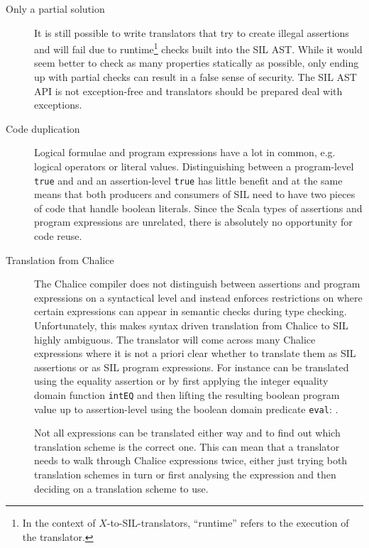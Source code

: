\begin{description}
\item[Only a partial solution] It is still possible to write translators that try to create illegal assertions and will fail due to runtime\footnote{In the context of $X$-to-SIL-translators, ``runtime'' refers to the execution of the translator.} checks built into the SIL AST.
While it would seem better to check as many properties statically as possible, only ending up with partial checks can result in a false sense of security. The SIL AST API is not exception-free and translators should be prepared deal with exceptions.
\item[Code duplication] Logical formulae and program expressions have a lot in common, e.g. logical operators or literal values. 
Distinguishing between a program-level \lstinline[language=Chalice]!true! and and an assertion-level \lstinline[language=Chalice]!true! has little benefit and at the same means that both producers and consumers of SIL need to have two pieces of code that handle boolean literals.
Since the Scala types of assertions and program expressions are unrelated, there is absolutely no opportunity for code reuse.
\item[Translation from Chalice] The Chalice compiler does not distinguish between assertions and program expressions on a syntactical level and instead enforces restrictions on where certain expressions can appear in semantic checks during type checking. Unfortunately, this makes syntax driven translation from Chalice to SIL highly ambiguous. The translator will come across many Chalice expressions where it is not a priori clear whether to translate them as SIL assertions or as SIL program expressions. For instance  can be translated using the equality assertion  or by first applying the integer equality domain function \lstinline!intEQ! and then lifting the resulting boolean program value up to assertion-level using the boolean domain predicate \lstinline!eval!: .

Not all expressions can be translated either way and to find out which translation scheme is the correct one. 
This can mean that a translator needs to walk through Chalice expressions twice, either just trying both translation schemes in turn or first analysing the expression and then deciding on a translation scheme to use.


\end{description}

